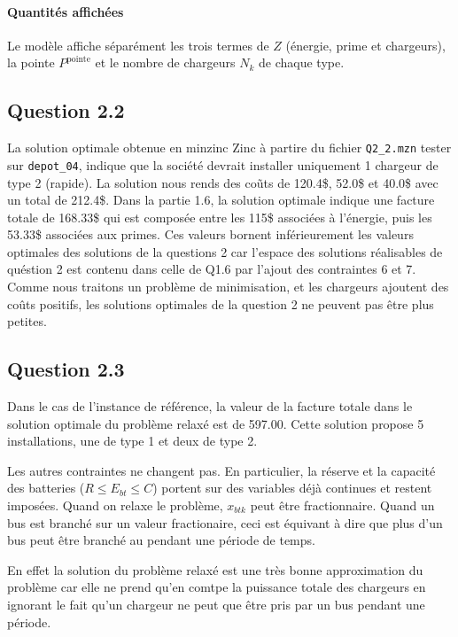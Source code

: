 \documentclass{article}
\begin{document}
\paragraph{Quantités affichées}
Le modèle affiche séparément les trois termes de $Z$ (énergie, prime et chargeurs), la pointe $P^{\text{pointe}}$ et le nombre de chargeurs $N_k$ de chaque type.


\subsection*{Question 2.2}
La solution optimale obtenue en minzinc Zinc à partire du fichier \texttt{Q2\_2.mzn} tester sur \texttt{depot\_04}, indique que la société devrait installer uniquement 1 chargeur de type 2 (rapide). La solution nous rends des coũts de 120.4\$, 52.0\$ et 40.0\$ avec un total de 212.4\$. Dans la partie 1.6, la solution optimale indique une facture totale de 168.33\$ qui est composée entre les 115\$ associées à l'énergie, puis les 53.33\$ associées aux primes. Ces valeurs bornent inférieurement les valeurs optimales des solutions de la questions 2 car l'espace des solutions réalisables de quéstion 2 est contenu dans celle de Q1.6 par l'ajout des contraintes 6 et 7. Comme nous traitons un problème de minimisation, et les chargeurs ajoutent des coûts positifs, les solutions optimales de la question 2 ne peuvent pas être plus petites.  


\subsection*{Question 2.3}
 Dans le cas de l'instance de référence, la valeur de la facture totale dans le solution optimale du problème relaxé est de 597.00. Cette solution propose 5 installations, une de type 1 et deux de type 2. 

Les autres contraintes ne changent pas. En particulier, la réserve et la capacité des batteries ($R \leq E_{bt} \leq C$) portent sur des variables déjà continues et restent imposées. Quand on relaxe le problème, $x_{btk}$ peut être fractionnaire. Quand un bus est branché sur un valeur fractionaire, ceci est équivant à dire que plus d'un bus peut être branché au pendant une période de temps. 

En effet la solution du problème relaxé est une très bonne approximation du problème car elle ne prend qu'en comtpe la puissance totale des chargeurs en ignorant le fait qu'un chargeur ne peut que être pris par un bus pendant une période. 
\end{document}
